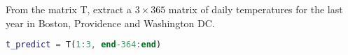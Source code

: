 From the matrix T, extract a $3 \times 365$ matrix of daily temperatures for the last year in Boston, Providence and Washington DC.

\begin{solution}
\begin{lstlisting}[language=Matlab]
t_predict = T(1:3, end-364:end)
\end{lstlisting}
\end{solution}